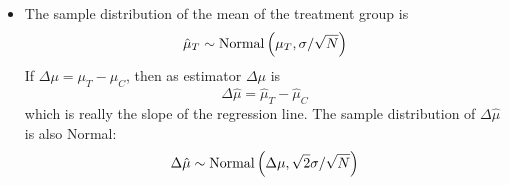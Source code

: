 \begin{itemize}
\item The sample distribution of the mean of the treatment group is
\begin{equation*}
\hat{\mu}_T \sim {\rm Normal}\left(\mu_T,\sigma/\sqrt{N}\right)
\end{equation*}
If  $\Delta \mu = \mu_T-\mu_C$, then as estimator $\Delta \mu$ is 
\begin{equation*}
\Delta \hat{\mu} =  \hat{\mu}_T-\hat{\mu}_C
\end{equation*}
which is really the slope of the regression line. 
The sample distribution of $\Delta \hat{\mu}$ is also Normal:
\begin{equation*}
\Delta \hat{\mu} \sim {\rm Normal}\left(\Delta \mu, \sqrt{2}\sigma/\sqrt{N}\right)
\end{equation*}





\end{itemize}







 



